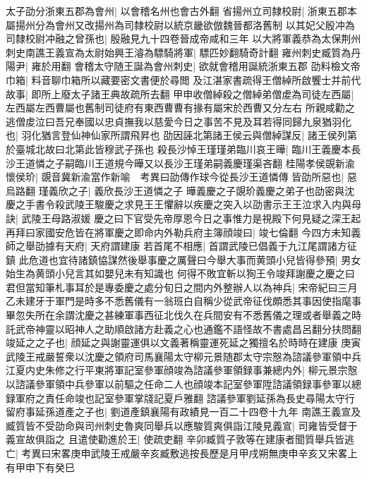 太子劭分浙東五郡為會州|{
	以會稽名州也會古外翻}
省揚州立司隸校尉|{
	浙東五郡本屬揚州分為會州又改揚州為司隸校尉以統京畿欲倣魏晉都洛舊制}
以其妃父殷冲為司隸校尉冲融之曾孫也|{
	殷融見九十四卷晉成帝咸和三年}
以大將軍義恭為太保荆州刺史南譙王義宣為太尉始興王濬為驃騎將軍|{
	驃匹妙翻騎奇計翻}
雍州刺史臧質為丹陽尹|{
	雍於用翻}
會稽太守随王誕為會州刺史|{
	欲就會稽用誕統浙東五郡}
劭料檢文帝巾箱|{
	料音聊巾箱所以藏要密文書便於尋閲}
及江湛家書疏得王僧綽所啟饗士并前代故事|{
	即所上廢太子諸王典故疏所去翻}
甲申收僧綽殺之僧綽弟僧䖍為司徒左西屬|{
	左西屬左西曹屬也舊制司徒府有東西曹曹有掾有屬宋於西曹又分左右}
所親咸勸之逃僧䖍泣曰吾兄奉國以忠貞撫我以慈愛今日之事苦不見及耳若得同歸九泉猶羽化也|{
	羽化猶言登仙神仙家所謂飛昇也}
劭因誣北第諸王侯云與僧綽謀反|{
	諸王侯列第於臺城北故曰北第此皆穆武子孫也}
殺長沙悼王瑾瑾弟臨川哀王曄|{
	臨川王義慶本長沙王道憐之子嗣臨川王道規今曄又以長沙王瑾弟嗣義慶瑾渠吝翻}
桂陽孝侯覬新渝懷侯玠|{
	覬音冀新渝當作新喻　考異曰劭傳作球今從長沙王道憐傳}
皆劭所惡也|{
	惡烏路翻}
瑾義欣之子|{
	義欣長沙王道憐之子}
曄義慶之子覬玠義慶之弟子也劭密與沈慶之手書令殺武陵王駿慶之求見王王懼辭以疾慶之突入以劭書示王王泣求入内與母訣|{
	武陵王母路淑媛}
慶之曰下官受先帝厚恩今日之事惟力是視殿下何見疑之深王起再拜曰家國安危皆在將軍慶之即命内外勒兵府主簿顔竣曰|{
	竣七倫翻}
今四方未知義師之舉劭據有天府|{
	天府謂建康}
若首尾不相應|{
	首謂武陵已倡義于九江尾謂諸方征鎮}
此危道也宜待諸鎮恊謀然後舉事慶之厲聲曰今舉大事而黄頭小兒皆得參預|{
	男女始生為黄頭小兒言其如嬰兒未有知識也}
何得不敗宜斬以狥王令竣拜謝慶之慶之曰君但當知筆札事耳於是專委慶之處分旬日之間内外整辦人以為神兵|{
	宋帝紀曰三月乙未建牙于軍門是時多不悉舊儀有一翁班白自稱少從武帝征伐頗悉其事因使指麾事畢忽失所在余謂沈慶之甚練軍事西征北伐久在兵間安有不悉舊儀之理或者舉義之時託武帝神靈以昭神人之助順啟諸方赴義之心也通鑑不語怪故不書處昌呂翻分扶問翻}
竣延之之子也|{
	顔延之與謝靈運俱以文義著稱靈運死延之獨擅名於時時在建康}
庚寅武陵王戒嚴誓衆以沈慶之領府司馬襄陽太守柳元景随郡太守宗慤為諮議參軍領中兵江夏内史朱修之行平東將軍記室參軍顔竣為諮議參軍領録事兼總内外|{
	柳元景宗慤以諮議參軍領中兵參軍以前驅之任命二人也顔竣本記室參軍陞諮議領録事參軍以總録軍府之責任命竣也記室參軍掌牋記夏戶雅翻}
諮議參軍劉延孫為長史尋陽太守行留府事延孫道產之子也|{
	劉道產鎮襄陽有政績見一百二十四卷十九年}
南譙王義宣及臧質皆不受劭命與司州刺史魯爽同舉兵以應駿質爽俱詣江陵見義宣|{
	司雍皆受督于義宣故俱詣之}
且遣使勸進於王|{
	使疏吏翻}
辛卯臧質子敦等在建康者聞質舉兵皆逃亡|{
	考異曰宋畧庚申武陵王戒嚴辛亥臧敷逃按長歷是月甲戌朔無庚申辛亥又宋畧上有甲申下有癸巳}


